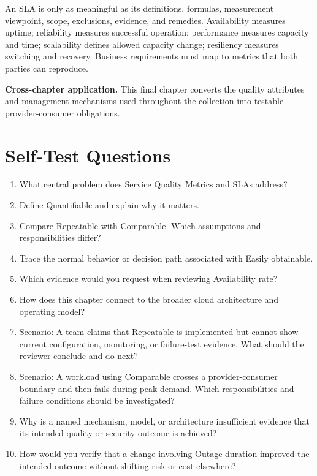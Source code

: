\documentclass[11pt]{article}
\begin{document}
\begin{synthesisbox}
An SLA is only as meaningful as its definitions, formulas, measurement viewpoint, scope, exclusions, evidence, and remedies. Availability measures uptime; reliability measures successful operation; performance measures capacity and time; scalability defines allowed capacity change; resiliency measures switching and recovery. Business requirements must map to metrics that both parties can reproduce.
\par\smallskip
\textbf{Cross-chapter application.} This final chapter converts the quality attributes and management mechanisms used throughout the collection into testable provider-consumer obligations.
\end{synthesisbox}
\section{Self-Test Questions}
\begin{enumerate}
\item What central problem does Service Quality Metrics and SLAs address?
\item Define Quantifiable and explain why it matters.
\item Compare Repeatable with Comparable. Which assumptions and responsibilities differ?
\item Trace the normal behavior or decision path associated with Easily obtainable.
\item Which evidence would you request when reviewing Availability rate?
\item How does this chapter connect to the broader cloud architecture and operating model?
\item Scenario: A team claims that Repeatable is implemented but cannot show current configuration, monitoring, or failure-test evidence. What should the reviewer conclude and do next?
\item Scenario: A workload using Comparable crosses a provider-consumer boundary and then fails during peak demand. Which responsibilities and failure conditions should be investigated?
\item Why is a named mechanism, model, or architecture insufficient evidence that its intended quality or security outcome is achieved?
\item How would you verify that a change involving Outage duration improved the intended outcome without shifting risk or cost elsewhere?
\end{enumerate}
\clearpage
\end{document}
